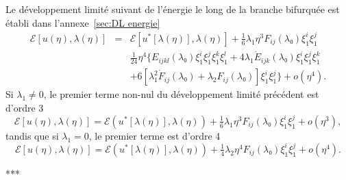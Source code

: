 \documentclass{article}
\begin{document}
Le développement limité suivant de l'énergie le long de la branche
bifurquée est établi dans l'annexe~\ref{sec:DL energie}
\begin{eqnarray}
  ℰ [u (η), λ (η)] & = & ℰ [u^{\ast} [λ
  (η)], λ (η)] + \tfrac{1}{6} λ_1 η^3 F_{i  j}
  (λ₀) ξ_1^i ξ_1^j \nonumber\\
  &  & \tfrac{1}{24} η^4  \{ E_{i  j  k  l}
  (λ₀) ξ_1^i ξ_1^j ξ_1^k ξ_1^l + 4 λ_1  \dot{E}_{i
   j  k} (λ₀) ξ_1^i ξ_1^j ξ_1^k
  \nonumber\\
  &  & +  6 [λ_1^2  \dot{F}_{i  j}
  (λ₀) + λ_2 F_{i  j} (λ₀)] ξ_1^i ξ_1^j \}
  + o (η^4) .  \label{eq:DL energie}
\end{eqnarray}
Si $λ_1 \neq 0$, le premier terme non-nul du développement
limité précédent est d'ordre 3
\begin{equation}
  ℰ [u (η), λ (η)] =ℰ (u^{\ast} [λ
  (η)], λ (η)) + \tfrac{1}{6} λ_1 η^3 F_{i  j}
  (λ₀) ξ_1^i ξ_1^j + o (η^3),
\end{equation}
tandis que si $λ_1 = 0$, le premier terme est d'ordre 4
\begin{equation}
  ℰ [u (η), λ (η)] =ℰ (u^{\ast} [λ
  (η)], λ (η)) + \tfrac{1}{4} λ_2 η^4 F_{i  j}
  (λ₀) ξ_1^i ξ_1^j + o (η^4) .
\end{equation}
\begin{center}
  ***
\end{center}
\end{document}
